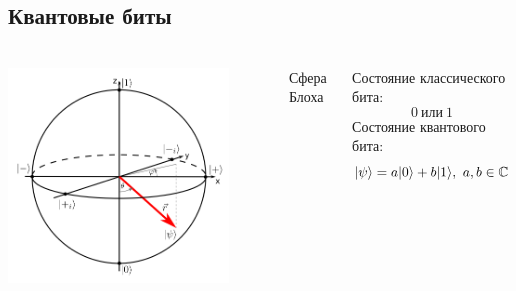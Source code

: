 \documentclass[aspectratio=169, 13pt]{beamer}
\DeclarePairedDelimiter\ket{\lvert}{\rangle}
\begin{document}
\subsection*{Квантовые биты}
\begin{frame}[c]\frametitle{\secname}\framesubtitle{\subsecname}
\begin{columns}[c]
\centering
\includegraphics[width=0.85\textwidth]{bloch_sphere}

Сфера Блоха

Состояние классического бита:
\begin{equation*}
0\ \text{или}\ 1
\end{equation*}
Состояние квантового бита:
\hspace{-2cm}
\begin{equation*}
\ket{\psi} = a\ket{0}+b\ket{1},\ a,b \in \mathbb{C}
\end{equation*}
\end{columns}
\end{frame}
\end{document}
